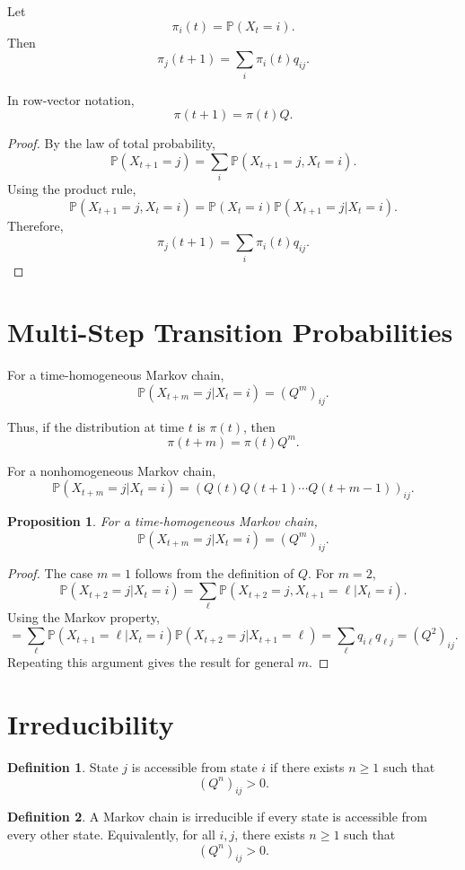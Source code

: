 \documentclass[12pt,oneside]{book}
\numberwithin{equation}{section}
\theoremstyle{definition}
\newtheorem{definition}{Definition}[section]
\theoremstyle{plain}
\newtheorem{proposition}{Proposition}[section]
\theoremstyle{remark}
\newcommand{\Prob}{\mathbb{P}}
\begin{document}
Let
\[
\pi_i(t)=\Prob(X_t=i).
\]
Then
\[
\pi_j(t+1)=\sum_i \pi_i(t)q_{ij}.
\]

In row-vector notation,
\[
\pi(t+1)=\pi(t)Q.
\]

\begin{proof}
By the law of total probability,
\[
\Prob(X_{t+1}=j)
=
\sum_i \Prob(X_{t+1}=j,X_t=i).
\]
Using the product rule,
\[
\Prob(X_{t+1}=j,X_t=i)
=
\Prob(X_t=i)\Prob(X_{t+1}=j|X_t=i).
\]
Therefore,
\[
\pi_j(t+1)=\sum_i \pi_i(t)q_{ij}.
\]
\end{proof}

\section{Multi-Step Transition Probabilities}

For a time-homogeneous Markov chain,
\[
\Prob(X_{t+m}=j|X_t=i)=(Q^m)_{ij}.
\]

Thus, if the distribution at time $t$ is $\pi(t)$, then
\[
\pi(t+m)=\pi(t)Q^m.
\]

For a nonhomogeneous Markov chain,
\[
\Prob(X_{t+m}=j|X_t=i)
=
\left(Q(t)Q(t+1)\cdots Q(t+m-1)\right)_{ij}.
\]

\begin{proposition}
For a time-homogeneous Markov chain,
\[
\Prob(X_{t+m}=j|X_t=i)=(Q^m)_{ij}.
\]
\end{proposition}

\begin{proof}
The case $m=1$ follows from the definition of $Q$. For $m=2$,
\[
\Prob(X_{t+2}=j|X_t=i)
=
\sum_{\ell}
\Prob(X_{t+2}=j,X_{t+1}=\ell|X_t=i).
\]
Using the Markov property,
\[
=
\sum_{\ell}
\Prob(X_{t+1}=\ell|X_t=i)
\Prob(X_{t+2}=j|X_{t+1}=\ell)
=
\sum_{\ell}q_{i\ell}q_{\ell j}
=
(Q^2)_{ij}.
\]
Repeating this argument gives the result for general $m$.
\end{proof}

\section{Irreducibility}

\begin{definition}
State $j$ is accessible from state $i$ if there exists $n\ge 1$ such that
\[
(Q^n)_{ij}>0.
\]
\end{definition}

\begin{definition}
A Markov chain is irreducible if every state is accessible from every other state. Equivalently, for all $i,j$, there exists $n\ge 1$ such that
\[
(Q^n)_{ij}>0.
\]
\end{definition}
\end{document}
